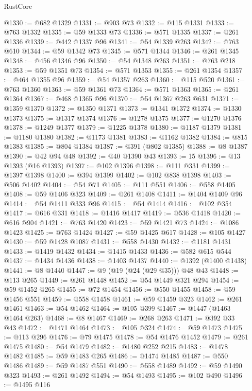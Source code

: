 \begin{lexlean}{RustCore}
\begin{coremodule}
@1330 := @682 @1329
@1331 := @903 @73
@1332 := @115 @1331
@1333 := @763 @1332
@1335 := @59 @1333 @73
@1336 := @571 @1335
@1337 := @261 @1336
@1339 := @442 @1337 @96
@1341 := @54 @1339 @263
@1342 := @763 @610
@1344 := @59 @1342 @73
@1345 := @571 @1344
@1346 := @261 @1345
@1348 := @456 @1346 @96
@1350 := @54 @1348 @263
@1351 := @763 @218
@1353 := @59 @1351 @73
@1354 := @571 @1353
@1355 := @261 @1354
@1357 := @464 @1355 @96
@1359 := @54 @1357 @263
@1360 := @115 @520
@1361 := @763 @1360
@1363 := @59 @1361 @73
@1364 := @571 @1363
@1365 := @261 @1364
@1367 := @468 @1365 @96
@1370 := @54 @1367 @263 @631
@1371 := @1359 @1370
@1372 := @1350 @1371
@1373 := @1341 @1372
@1374 := @1330 @1373
@1375 := @1317 @1374
@1376 := @1278 @1375
@1377 := @1270 @1376
@1378 := @1249 @1377
@1379 := @1225 @1378
@1380 := @1187 @1379
@1381 := @1180 @1380
@1382 := @1173 @1381
@1383 := @1162 @1382
@1384 := @815 @1383
@1385 := @804 @1384
@1387 := @391 (@802 @1385)
@1388 := @8 @1387
@1390 := @42 @94 @48
@1392 := @40 @1390 @43
@1393 := 15
@1396 := @13 @1393 (@16 @1393)
@1397 := @102 @1396
@1398 := @111 @331
@1399 := @1397 @1398
@1400 := @394 @1399
@1402 := @102 @838 @1398
@1403 := @506 @1402
@1404 := @54 @71
@1405 := @111 @551
@1406 := @558 @1405
@1408 := @59 @1406 @323
@1409 := @261 @1408
@1411 := @1404 @1409 @96
@1414 := @54 @1411 @333 @96
@1415 := @54 @1414
@1416 := @102 @354
@1417 := @616 @331
@1418 := @1416 @1417
@1419 := @536 @1418
@1420 := @616 @904
@1421 := @763 @1420
@1423 := @59 @1421 @73
@1424 := @1086 @1423
@1425 := @763 @1424
@1427 := @59 @1425 @617
@1428 := @105 @1427
@1430 := @59 @1428 @1087
@1431 := @558 @1430
@1432 := @1181 @1431
@1433 := @1419 @1432
@1434 := @1415 @1433
@1436 := @582 @615 @544
@1437 := @1434 @1436
@1438 := @1403 @1437
@1440 := @1392 (@1400 @1438)
@1441 := @8 @1440
@1447 := @9 (@19 (@24 (@29 @35))) @48 @43
@1448 := @113 @265
@1449 := @261 @1448
@1452 := @54 @1449 @321 @294
@1454 := @59 @1452 @265
@1455 := @72 @1454
@1456 := @550 @1455
@1458 := @59 @1456 @551
@1459 := @558 @1458
@1461 := @59 @1459 @323
@1462 := @261 @1461
@1463 := @54 @1462
@1464 := @105 @399
@1467 := @1447 (@1463 @1464 @263)
@1468 := @8 @1467
@1469 := @268 @263
@1471 := @392 @33 @43
@1472 := @1471 @1464
@1473 := @105 @324
@1474 := @59 @1473
@1475 := @113 @296
@1476 := @79 @1475
@1478 := @54 @1476 @1452
@1479 := @261 @1475
@1480 := @54 @1479
@1482 := @1480 @252 @215
@1483 := @1478 @1482
@1485 := @59 @1483 @265
@1486 := @1474 @1485
@1487 := @550 @1486
@1489 := @59 @1487 @551
@1490 := @558 @1489
@1492 := @59 @1490 @323
@1493 := @261 @1492
@1494 := @54 @1493
@1495 := @102 @490
@1496 := @1495 @116

\end{coremodule}
\end{lexlean}
